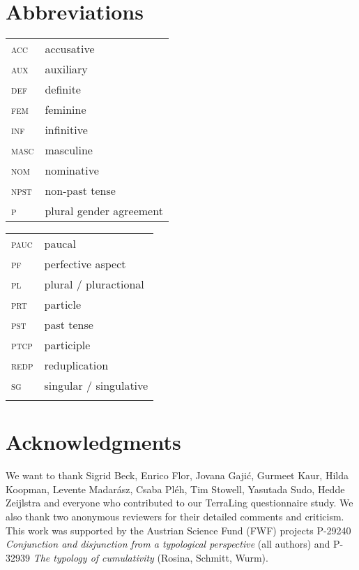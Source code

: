 \documentclass[output=paper]{langscibook}
\begin{document}
\section*{Abbreviations}
\begin{tabularx}{.45\textwidth}{lQ}
\textsc{acc} & accusative \\
\textsc{aux} & auxiliary \\
\textsc{def} & definite \\
\textsc{fem} & feminine \\
\textsc{inf} & infinitive \\
\textsc{masc} & masculine \\
\textsc{nom} & nominative \\
\textsc{npst} & non-past tense \\
\textsc{p} & plural gender agreement \\
\end{tabularx}
\begin{tabularx}{.45\textwidth}{lQ}
\textsc{pauc} & paucal \\
\textsc{pf} & perfective aspect \\
\textsc{pl} & plural / pluractional \\
\textsc{prt} & particle \\
\textsc{pst} & past tense \\
\textsc{ptcp} & participle \\
\textsc{redp} & reduplication \\
\textsc{sg} & singular / singulative \\
&\\
\end{tabularx}

\section*{Acknowledgments}
We want to thank Sigrid Beck, Enrico Flor, Jovana Gajić, Gurmeet Kaur, Hilda Koopman, Levente Madarász, Csaba Pléh, Tim Stowell, Yasutada Sudo, Hedde Zeijlstra and everyone who contributed to our TerraLing questionnaire study. We also thank two anonymous reviewers for their detailed comments and criticism. This work was supported by the Austrian Science Fund (FWF) projects P-29240 \textit{Conjunction and disjunction from a typological perspective} (all authors) and P-32939 \textit{The typology of cumulativity} (Rosina, Schmitt, Wurm).


{\sloppy\printbibliography[heading=subbibliography,notkeyword=this]}
\end{document}

